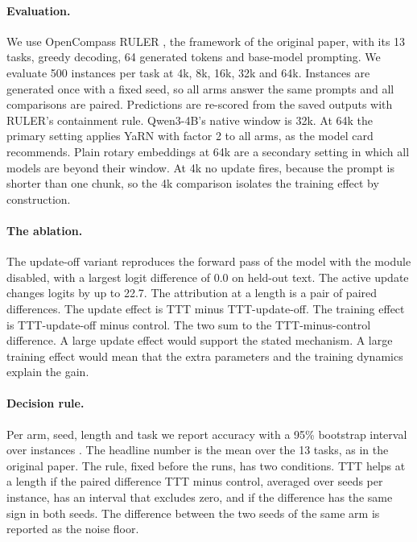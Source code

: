 \documentclass{article}
\begin{document}
\paragraph{Evaluation.} We use OpenCompass RULER \citep{opencompass2023, hsieh2024ruler}, the framework of the original paper, with its 13 tasks, greedy decoding, 64 generated tokens and base-model prompting. We evaluate 500 instances per task at 4k, 8k, 16k, 32k and 64k. Instances are generated once with a fixed seed, so all arms answer the same prompts and all comparisons are paired. Predictions are re-scored from the saved outputs with RULER's containment rule. Qwen3-4B's native window is 32k. At 64k the primary setting applies YaRN \citep{peng2023yarn} with factor 2 to all arms, as the model card recommends. Plain rotary embeddings \citep{su2021roformer} at 64k are a secondary setting in which all models are beyond their window. At 4k no update fires, because the prompt is shorter than one chunk, so the 4k comparison isolates the training effect by construction.

\paragraph{The ablation.} The update-off variant reproduces the forward pass of the model with the module disabled, with a largest logit difference of 0.0 on held-out text. The active update changes logits by up to 22.7. The attribution at a length is a pair of paired differences. The update effect is TTT minus TTT-update-off. The training effect is TTT-update-off minus control. The two sum to the TTT-minus-control difference. A large update effect would support the stated mechanism. A large training effect would mean that the extra parameters and the training dynamics explain the gain.

\paragraph{Decision rule.} Per arm, seed, length and task we report accuracy with a 95\% bootstrap interval over instances \citep{efron1979bootstrap}. The headline number is the mean over the 13 tasks, as in the original paper. The rule, fixed before the runs, has two conditions. TTT helps at a length if the paired difference TTT minus control, averaged over seeds per instance, has an interval that excludes zero, and if the difference has the same sign in both seeds. The difference between the two seeds of the same arm is reported as the noise floor.
\end{document}
